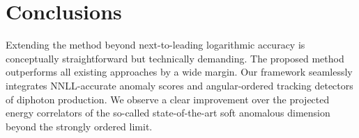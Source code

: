 \section{Conclusions}\label{sec:conclusions}

Extending the method beyond next-to-leading logarithmic accuracy is
conceptually straightforward but technically demanding. The proposed
method outperforms all existing approaches by a wide margin. Our
framework seamlessly integrates NNLL-accurate anomaly scores and
angular-ordered tracking detectors of diphoton production. We observe a
clear improvement over the projected energy correlators of the so-called
state-of-the-art soft anomalous dimension beyond the strongly ordered
limit.

